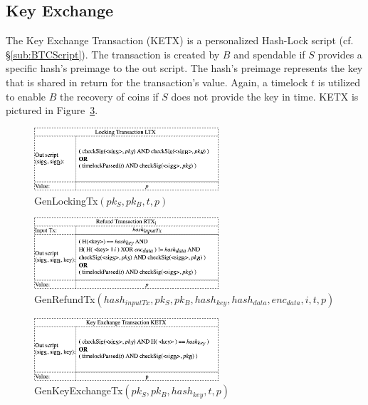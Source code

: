 \documentclass{cacthesis}
\begin{document}
        \subsection{Key Exchange}
        \label{sub:KeyExchangeTx}
        The Key Exchange Transaction (KETX) is a personalized Hash-Lock script (cf. §\ref{sub:BTCScript}). The transaction is created by $B$ and spendable if $S$ provides a specific hash's preimage to the out script. The hash's preimage represents the key that is shared in return for the transaction's value. Again, a timelock $t$ is utilized to enable $B$ the recovery of coins if $S$ does not provide the key in time. KETX is pictured in \mbox{Figure \ref{fig:genKeyExchangeTx}}.
        
        \begin{figure}
            \begin{center}
              \includegraphics[width=0.61\textwidth]{images/GenLockingTx.png}
              \caption{\textsf{GenLockingTx}$(pk_S, pk_B, t, p)$}
              \label{fig:genLockingTx}
            \end{center}
        \end{figure}
        
        \begin{figure}
            \begin{center}
              \includegraphics[width=0.61\textwidth]{images/GenRefundTx.png}
              \caption{\textsf{GenRefundTx}$(hash_{inputTx}, pk_S, pk_B, hash_{key}, hash_{data}, enc_{data}, i, t, p)$}
              \label{fig:genRefundTx}
            \end{center}
        \end{figure}
        
        \begin{figure}
            \begin{center}
              \includegraphics[width=0.61\textwidth]{images/GenKeyExchangeTx.png}
              \caption{\textsf{GenKeyExchangeTx}$(pk_S, pk_B, hash_{key}, t, p)$}
              \label{fig:genKeyExchangeTx}
            \end{center}
        \end{figure}
        
\end{document}
